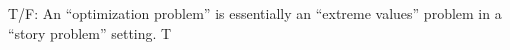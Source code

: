 {T/F: An ``optimization problem'' is essentially an ``extreme values'' problem in a ``story problem'' setting.}
{T
}


